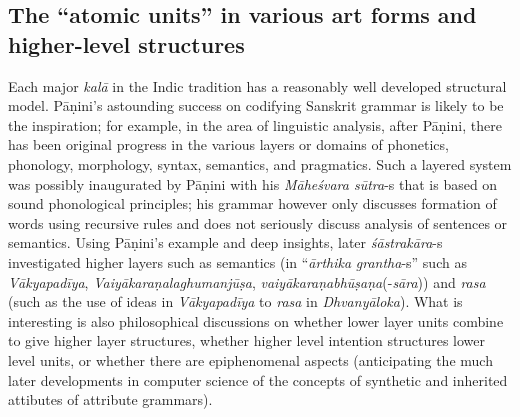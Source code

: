 \subsection{The “atomic units” in various art forms and higher-level structures}\label{chap3-sec4.1}

Each major \textsl{kalā} in the Indic tradition has a reasonably well developed structural model. Pāṇini’s astounding success on codifying Sanskrit grammar is likely to be the inspiration; for example, in the area of linguistic analysis, after Pāṇini, there has been original progress in the various layers or domains of phonetics, phonology, morphology, syntax, semantics, and pragmatics. Such a layered system was possibly inaugurated by Pāṇini with his \textsl{Māheśvara sūtra}-s that is based on sound phonological principles; his grammar however only discusses formation of words using recursive rules and does not seriously discuss analysis of sentences or semantics. Using Pāṇini’s example and deep insights, later \textsl{śāstrakāra}-s investigated higher layers such as semantics (in “\textsl{ārthika} \textsl{grantha}-s” such as \textsl{Vākyapadīya}, \textsl{Vaiyākaraṇalaghumanjūṣa}, \textsl{vaiyākaraṇabhūṣaṇa}(-\textsl{sāra})) and \textsl{rasa} (such as the use of ideas in \textsl{Vākyapadīya} to \textsl{rasa} in \textsl{Dhvanyāloka}). What is interesting is also philosophical discussions on whether lower layer units combine to give higher layer structures, whether higher level intention structures lower level units, or whether there are epiphenomenal aspects (anticipating the much later developments in computer science of the concepts of synthetic and inherited attibutes of attribute grammars).

\newpage

